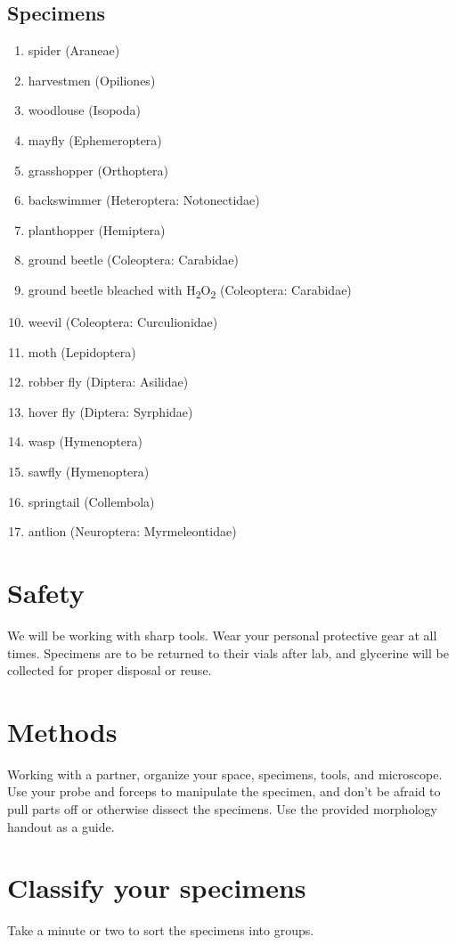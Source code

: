\documentclass[letterpaper, 11pt]{article}
\begin{document}
\subsection*{Specimens}
\begin{enumerate}
	\item {spider (Araneae)}
	\item {harvestmen (Opiliones)}
	\item {woodlouse (Isopoda)}
	\item {mayfly (Ephemeroptera)}
	\item {grasshopper (Orthoptera)}
	\item {backswimmer (Heteroptera: Notonectidae)}
	\item {planthopper (Hemiptera)}
	\item {ground beetle (Coleoptera: Carabidae)}
	\item {ground beetle bleached with H\textsubscript{2}O\textsubscript{2} (Coleoptera: Carabidae)}
	\item {weevil (Coleoptera: Curculionidae)}
	\item {moth (Lepidoptera)}
	\item {robber fly (Diptera: Asilidae)}
	\item {hover fly (Diptera: Syrphidae)}
	\item {wasp (Hymenoptera)}
	\item {sawfly (Hymenoptera)}
	\item {springtail (Collembola)}
	\item {antlion (Neuroptera: Myrmeleontidae)}
\end{enumerate}

\section*{Safety}
We will be working with sharp tools. Wear your personal protective gear at all times. Specimens are to be returned to their vials after lab, and glycerine will be collected for proper disposal or reuse.

\section*{Methods}
Working with a partner, organize your space, specimens, tools, and microscope. Use your probe and forceps to manipulate the specimen, and don't be afraid to pull parts off or otherwise dissect the specimens. Use the provided morphology handout as a guide.

\section{Classify your specimens}
Take a minute or two to sort the specimens into groups. \\
\end{document}

